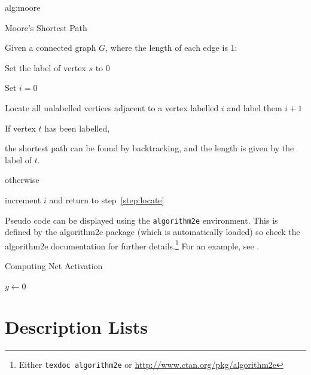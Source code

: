 \documentclass[pmlr,twocolumn,10pt]{jmlr} %
\begin{document}
\begin{algorithm}
\floatconts
  {alg:moore}%
  {\caption{Moore's Shortest Path}}%
{%
Given a connected graph $G$, where the length of each edge is 1:
\begin{enumerate*}
  \item Set the label of vertex $s$ to 0
  \item Set $i=0$
  \begin{enumerate*}
    \item \label{step:locate}Locate all unlabelled vertices 
          adjacent to a vertex labelled $i$ and label them $i+1$
    \item If vertex $t$ has been labelled,
    \begin{enumerate*}
      \item[] the shortest path can be found by backtracking, and 
      the length is given by the label of $t$.
    \end{enumerate*}
    otherwise
    \begin{enumerate*}
      \item[] increment $i$ and return to step~\ref{step:locate}
    \end{enumerate*}
  \end{enumerate*}
\end{enumerate*}
}%
\end{algorithm}

Pseudo code can be displayed using the \texttt{algorithm2e}
environment. This is defined by the \textsf{algorithm2e} package
(which is automatically loaded) so check the \textsf{algorithm2e}
documentation for further details.\footnote{Either \texttt{texdoc
algorithm2e} or \url{http://www.ctan.org/pkg/algorithm2e}}
For an example, see .

\begin{algorithm2e}
\caption{Computing Net Activation}
\label{alg:net}
{}
$y\leftarrow 0$\;
\end{algorithm2e}

\section{Description Lists}
\end{document}
